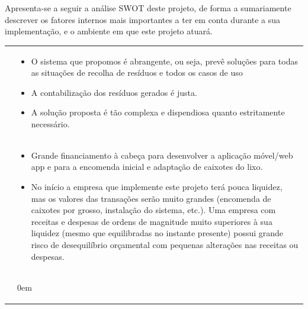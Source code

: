 \documentclass[11pt, a4paper, oneside]{book}
\begin{document}
Apresenta-se a seguir a análise SWOT deste projeto, de forma a sumariamente descrever os fatores internos mais importantes a ter em conta durante a sua implementação, e o ambiente em que este projeto atuará.

\begin{center}
    \begin{tabular}{c l @{}}
        \cellcolor{strengthgreen!80 }\color{white}{\Large\textbf{Strengths}} &
            \begin{minipage}{122mm}\vspace{0.4em}\begin{itemize}\itemsep0em
                \item O sistema que propomos é abrangente, ou seja, prevê soluções para todas as situações de recolha de resíduos e todos os casos de uso
                \item A contabilização dos resíduos gerados é justa.
                \item A solução proposta é tão complexa e dispendiosa quanto estritamente necessário.
            \end{itemize}\vspace{0.0em}\end{minipage} \\
        \cellcolor{red!80   }\color{white}{\Large\textbf{Weaknesses}} & 
            \begin{minipage}{122mm}\vspace{0.4em}\begin{itemize}\itemsep0em
                \item Grande financiamento à cabeça para desenvolver a aplicação móvel/web app e para a encomenda inicial e adaptação de caixotes do lixo.
                \item No início a empresa que implemente este projeto terá pouca liquidez, mas os valores das transações serão muito grandes (encomenda de caixotes por grosso, instalação do sistema, etc.). Uma empresa com receitas e despesas de ordens de magnitude muito superiores à sua liquidez (mesmo que equilibradas no instante presente) possui grande risco de desequilíbrio orçamental com pequenas alterações nas receitas ou despesas.
            \end{itemize}\vspace{0.0em}\end{minipage} \\
        \cellcolor{blue!80  }\color{white}{\Large\textbf{Opportunities}} &
            \begin{minipage}{122mm}\vspace{0.4em}\begin{itemize}\itemsep0em

\end{itemize}
\end{minipage}
\end{tabular}
\end{center}
\end{document}

